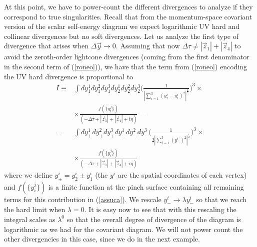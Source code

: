 \documentclass[%
 reprint,
 amsmath,amssymb,
 aps,
]{revtex4-1}
\begin{document}
At this point, we have to power-count the different divergences to analyze if they correspond to true singularities. Recall that from the momentum-space  covariant version of the scalar self-energy diagram we expect logarithmic UV hard and collinear divergences but no soft divergences. Let us analyze the first type of divergence that arises when $\Delta \vec{y}\to 0$. Assuming that now $\Delta\tau\neq|\vec{z}_1|+|\vec{z}_4|$ to avoid the zeroth-order lightcone divergences (coming from the first denominator in the second term of (\ref{roneo})), we have that the term from (\ref{roneo}) encoding the UV hard divergence is proportional to
 \begin{align}
 I\equiv&\int dy_1^1dy_1^2dy_1^3dy_2^1dy_2^2dy_2^3\Big(\frac{1}{|\sum_{i=1}^3(y_2^i-y_1^i)^2|^{\frac{1}{2}}}\Big)^3\times\nonumber\\
 &\times\frac{f(\{y_i^j\})}{(-\Delta\tau+|\vec{z}_1|+|\vec{z}_4|+i\eta)}\nonumber=\\
 =&\int dy_+^1dy_+^2dy_+^3dy_-^1dy_-^2dy_-^3\Big(\frac{1}{2|\sum_{i=1}^3(y_-^i)^2|^{\frac{1}{2}}}\Big)^3\times\nonumber\\
 &\times\frac{f(\{y_i^j\})}{(-\Delta\tau+|\vec{z}_1|+|\vec{z}_4|+i\eta)}
 \end{align}
 where we define $y_\pm^i=y_2^i\pm y_1^i$ (the $y^i$ are the spatial coordinates of each vertex) and $f(\{y_i^j\})$ is a finite function at the pinch surface containing all remaining terms for this contribution in (\ref{assuca}). We rescale $y_-^i\to\lambda y_-^i$ so that we reach the hard limit when $\lambda=0$. It is easy now to see that with this rescaling the integral scales as $\lambda^0$ so that the overall degree of divergence of the diagram is logarithmic as we had for the covariant diagram. We will not power count the other divergencies in this case, since we do in the next example.
 
 
\end{document}
